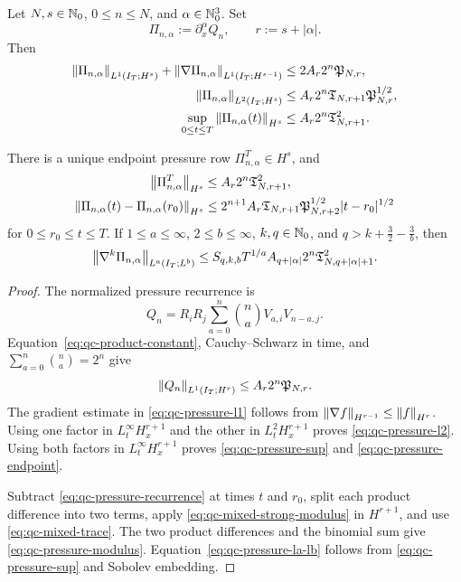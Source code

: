 \begin{theorem}
\label{thm:qc-pressure-rows}
\begin{samepage}
Let \(N,s\in\mathbb N_0\), \(0\le n\le N\), and
\(\alpha\in\mathbb N_0^3\).  Set
\[
 \Pi_{n,\alpha}:=\partial_x^\alpha Q_n,
 \qquad r:=s+|\alpha|.
\]
Then
\begin{align}
 \left\lVert \Pi_{n,\alpha}\right\rVert_{L^1(I_T;H^s)}
 +\left\lVert \nabla\Pi_{n,\alpha}\right\rVert_{L^1(I_T;H^{s-1})}
 &\le 2A_r2^n\mathfrak P_{N,r},
 \label{eq:qc-pressure-l1}\\
 \left\lVert \Pi_{n,\alpha}\right\rVert_{L^2(I_T;H^s)}
 &\le A_r2^n
 \mathfrak T_{N,r+1}\mathfrak P_{N,r}^{1/2},
 \label{eq:qc-pressure-l2}\\
 \sup_{0\le t\le T}\left\lVert \Pi_{n,\alpha}(t)\right\rVert_{H^s}
 &\le A_r2^n\mathfrak T_{N,r+1}^2.
 \label{eq:qc-pressure-sup}
\end{align}
\end{samepage}
There is a unique endpoint pressure row \(\Pi_{n,\alpha}^T\in H^s\), and
\begin{align}
 \left\lVert \Pi_{n,\alpha}^T\right\rVert_{H^s}
 &\le A_r2^n\mathfrak T_{N,r+1}^2,
 \label{eq:qc-pressure-endpoint}\\
 \left\lVert \Pi_{n,\alpha}(t)-\Pi_{n,\alpha}(r_0)\right\rVert_{H^s}
 &\le 2^{n+1}A_r\mathfrak T_{N,r+1}
 \mathfrak P_{N,r+2}^{1/2}|t-r_0|^{1/2}
 \label{eq:qc-pressure-modulus}
\end{align}
for \(0\le r_0\le t\le T\).  If
\(1\le a\le\infty\), \(2\le b\le\infty\),
\(k,q\in\mathbb N_0\), and
\(q>k+\frac32-\frac3b\), then
\begin{equation}
 \left\lVert \nabla^k\Pi_{n,\alpha}\right\rVert_{L^a(I_T;L^b)}
 \le
 S_{q,k,b}T^{1/a}A_{q+|\alpha|}2^n
 \mathfrak T_{N,q+|\alpha|+1}^2.
 \label{eq:qc-pressure-la-lb}
\end{equation}
\end{theorem}

\begin{proof}
The normalized pressure recurrence is
\begin{equation}
 Q_n=R_iR_j\sum_{a=0}^{n}\binom na V_{a,i}V_{n-a,j}.
 \label{eq:qc-pressure-recurrence}
\end{equation}
Equation~\eqref{eq:qc-product-constant}, Cauchy--Schwarz in time, and
\(\sum_{a=0}^n\binom na=2^n\) give
\begin{equation}
 \left\lVert Q_n\right\rVert_{L^1(I_T;H^r)}
 \le A_r2^n\mathfrak P_{N,r}.
 \label{eq:qc-pressure-L1-sharp}
\end{equation}
The gradient estimate in \eqref{eq:qc-pressure-l1} follows from
\(\left\lVert \nabla f\right\rVert_{H^{r-1}}\le\left\lVert f\right\rVert_{H^r}\).
Using one factor in \(L_t^\infty H_x^{r+1}\) and the other in
\(L_t^2H_x^{r+1}\) proves \eqref{eq:qc-pressure-l2}.  Using both factors in
\(L_t^\infty H_x^{r+1}\) proves \eqref{eq:qc-pressure-sup} and
\eqref{eq:qc-pressure-endpoint}.

Subtract \eqref{eq:qc-pressure-recurrence} at times \(t\) and \(r_0\), split
each product difference into two terms, apply
\eqref{eq:qc-mixed-strong-modulus} in \(H^{r+1}\), and use
\eqref{eq:qc-mixed-trace}.  The two product differences and the binomial sum
give \eqref{eq:qc-pressure-modulus}.  Equation~\eqref{eq:qc-pressure-la-lb}
follows from \eqref{eq:qc-pressure-sup} and Sobolev embedding.
\end{proof}

